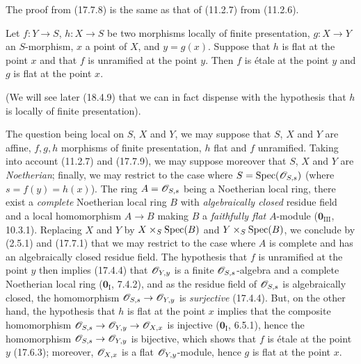 The proof from (17.7.8) is the same as that of (11.2.7) from (11.2.6).

\begin{proposition}[17.7.10]
\label{IV.17.7.10}
Let $f:Y\to S$, $h:X\to S$ be two morphisms locally of finite presentation, $g:X\to Y$ an $S$-morphism, $x$ a point of $X$, and $y=g(x)$. Suppose that $h$ is \textup{flat} at the point $x$ and that $f$ is \textup{unramified} at the point $y$. Then $f$ is \textup{étale} at the point $y$ and $g$ is \textup{flat} at the point $x$.
\end{proposition}

(We will see later (18.4.9) that we can in fact dispense with the hypothesis that $h$ is locally of finite presentation).

The question being local on $S$, $X$ and $Y$, we may suppose that $S$, $X$ and $Y$ are affine, $f,g,h$ morphisms of finite presentation, $h$ flat and $f$ unramified. Taking into account (11.2.7) and (17.7.9), we may suppose moreover that $S$, $X$ and $Y$ are \emph{Noetherian}; finally, we may restrict to the case where $S=\operatorname{Spec}(\mathscr{O}_{S,s})$ (where $s=f(y)=h(x)$). The ring $A=\mathscr{O}_{S,s}$ being a Noetherian local ring, there exist a \emph{complete} Noetherian local ring $B$ with \emph{algebraically closed} residue field and a local homomorphism $A\to B$ making $B$ a \emph{faithfully flat} $A$-module ($\mathbf{0}_{\mathrm{III}}$, 10.3.1). Replacing $X$ and $Y$ by $X\times_S\operatorname{Spec}(B)$ and $Y\times_S\operatorname{Spec}(B)$, we conclude by (2.5.1) and (17.7.1) that we may restrict to the case where $A$ is complete and has an algebraically closed residue field. The hypothesis that $f$ is unramified at the point $y$ then implies (17.4.4) that $\mathscr{O}_{Y,y}$ is a finite $\mathscr{O}_{S,s}$-algebra and a complete Noetherian local ring ($\mathbf{0}_{\mathrm I}$, 7.4.2), and as the residue field of $\mathscr{O}_{S,s}$ is algebraically closed, the homomorphism $\mathscr{O}_{S,s}\to\mathscr{O}_{Y,y}$ is \emph{surjective} (17.4.4). But, on the other hand, the hypothesis that $h$ is flat at the point $x$ implies that the composite homomorphism $\mathscr{O}_{S,s}\to\mathscr{O}_{Y,y}\to\mathscr{O}_{X,x}$ is injective ($\mathbf{0}_{\mathrm I}$, 6.5.1), hence the homomorphism $\mathscr{O}_{S,s}\to\mathscr{O}_{Y,y}$ is bijective, which shows that $f$ is étale at the point $y$ (17.6.3); moreover, $\mathscr{O}_{X,x}$ is a flat $\mathscr{O}_{Y,y}$-module, hence $g$ is flat at the point $x$.

